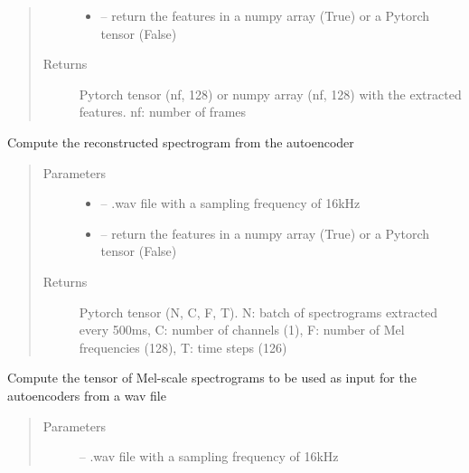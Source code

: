 \documentclass[letterpaper,10pt,english]{sphinxmanual}
\begin{document}
\begin{fulllineitems}
\begin{fulllineitems}
\begin{quote}
\begin{description}
\begin{itemize}
\item {} 
 -- return the features in a numpy array (True) or a Pytorch tensor (False)

\end{itemize}

\item[{Returns}] \leavevmode
Pytorch tensor (nf, 128) or numpy array (nf, 128) with the extracted features. nf: number of frames

\end{description}\end{quote}

\end{fulllineitems}


\begin{fulllineitems}
\label{\detokenize{RepLearning:AEspeech.AEspeech.compute_rec_spectrogram}}
Compute the  reconstructed spectrogram from the autoencoder
\begin{quote}\begin{description}
\item[{Parameters}] \leavevmode\begin{itemize}
\item {} 
 -- .wav file with a sampling frequency of 16kHz

\item {} 
 -- return the features in a numpy array (True) or a Pytorch tensor (False)

\end{itemize}

\item[{Returns}] \leavevmode
Pytorch tensor (N, C, F, T). N: batch of spectrograms extracted every 500ms, C: number of channels (1),  F: number of Mel frequencies (128), T: time steps (126)

\end{description}\end{quote}

\end{fulllineitems}


\begin{fulllineitems}
\label{\detokenize{RepLearning:AEspeech.AEspeech.compute_spectrograms}}
Compute the tensor of Mel-scale spectrograms to be used as input for the autoencoders from a wav file
\begin{quote}\begin{description}
\item[{Parameters}] \leavevmode
{} -- .wav file with a sampling frequency of 16kHz


\end{description}
\end{quote}
\end{fulllineitems}
\end{fulllineitems}
\end{document}
